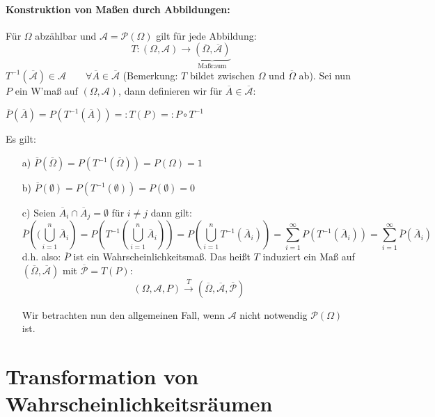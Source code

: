 \documentclass[10pt,a4paper]{report}
\numberwithin{equation}{section}
\numberwithin{figure}{section}
\theoremstyle{plain}
\theoremstyle{definition}
\theoremstyle{remark}
\theoremstyle{plain}
\newcommand{\1}{ \mathbb{1} } %
\begin{document}
\paragraph{Konstruktion von Maßen durch Abbildungen:}
Für $\Omega$ abzählbar und $\mathcal{A}=\mathcal{P}(\Omega)$ gilt für jede Abbildung:
\[T:(\Omega,\mathcal{A}) \to \underbrace{(\overline{\Omega},\overline{\mathcal{A}})}_\text{Maßraum}\]
$T^{-1}(\overline{\mathcal{A}})\in \mathcal{A} \qquad \forall \overline{A} \in \overline{\mathcal{A}}$ (Bemerkung: $T$ bildet zwischen $\Omega$ und  $\overline{\Omega}$ ab). Sei nun $P$ ein W'maß auf $(\Omega,\mathcal{A})$, dann definieren wir für $\overline{A} \in \overline{\mathcal{A}}$:
\begin{center}
$\overline{P}(\overline{A})=P(T^{-1}(\overline{A}))=:T(P)=:P\circ T^{-1}$
\end{center}
Es gilt:
\begin{itemize}
\item[a)] $\overline{P}(\overline{\Omega})=P(T^{-1}(\overline{\Omega}))=P(\Omega)=1$
\item[b)] $\overline{P}(\emptyset)=P(T^{-1}(\emptyset))=P(\emptyset)=0$
\item[c)] Seien $\overline{A}_i\cap \overline{A}_j=\emptyset$ für $i\neq j$ dann gilt:
 \[\overline{P}\left((\bigcup\limits_{i=1}^n \overline{A}_i \right)=P\left(T^{-1}\left(\bigcup\limits_{i=1}^n \overline{A}_i\right)\right)=P\left(\bigcup\limits_{i=1}^n T^{-1}(\overline{A}_i)\right)=\sum\limits_{i=1}^\infty P(T^{-1}(\overline{A}_i))=\sum\limits_{i=1}^\infty \overline{P}(\overline{A}_i)\]
  d.h. also: $\overline{P}$ ist ein Wahrscheinlichkeitsmaß. Das heißt
  $T$ induziert ein Maß auf
  $(\overline{\Omega},\overline{\mathcal{A}})$ mit
  $\overline{\mathcal{P}}=T(P)$:
    \[(\Omega, \mathcal{A}, P)
    \overset{T}{\to}(\overline{\Omega},\overline{\mathcal{A}},\overline{\mathcal{P}})\]

  Wir betrachten nun den allgemeinen Fall, wenn $\mathcal{A}$ nicht notwendig $\mathcal{P}(\Omega)$ ist.
\end{itemize}
\section{Transformation von Wahrscheinlichkeitsräumen}
\label{sec:trafo-wraeume}
\end{document}
